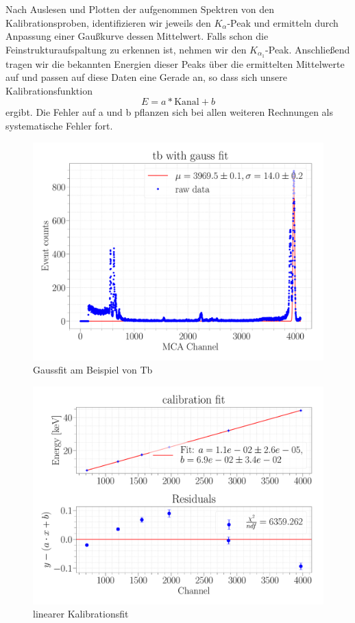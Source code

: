 \documentclass[a4paper,14pt]{article}
\begin{document}
Nach Auslesen und Plotten der aufgenommen Spektren von den Kalibrationsproben, identifizieren wir jeweils den $K_\alpha$-Peak und ermitteln durch Anpassung einer Gaußkurve dessen Mittelwert. Falls schon die Feinstrukturaufspaltung zu erkennen ist, nehmen wir den $K_{\alpha_1}$-Peak. Anschließend tragen wir die bekannten Energien dieser Peaks über die ermittelten Mittelwerte auf und passen auf diese Daten eine Gerade an, so dass sich unsere Kalibrationsfunktion
\begin{equation}
	E = a * \mathrm{Kanal} + b
\end{equation}
ergibt. Die Fehler auf a und b pflanzen sich bei allen weiteren Rechnungen als systematische Fehler fort.

\begin{figure}[H]
\centering
\includegraphics[width=\textwidth]{../Figures/am_tb_gauss.pdf}
\caption{Gaussfit am Beispiel von Tb}
\label{am_tb_gauss}
\end{figure}

\begin{figure}[H]
\centering
\includegraphics[scale=0.25]{../Figures/am_calibration_fit.pdf}
\caption{linearer Kalibrationsfit}
\label{am_calibration_fit}
\end{figure}
\end{document}
